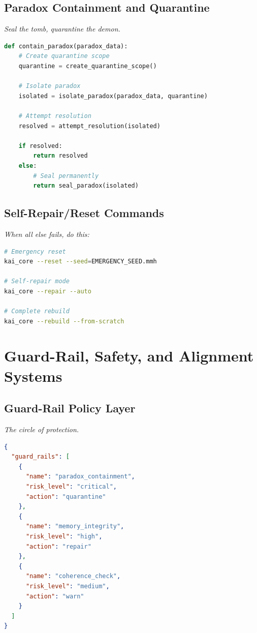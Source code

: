 \documentclass[11pt]{report}
\begin{document}
\section{Paradox Containment and Quarantine}
\textit{Seal the tomb, quarantine the demon.}

\begin{lstlisting}[language=python,caption={Paradox Containment}]
def contain_paradox(paradox_data):
    # Create quarantine scope
    quarantine = create_quarantine_scope()
    
    # Isolate paradox
    isolated = isolate_paradox(paradox_data, quarantine)
    
    # Attempt resolution
    resolved = attempt_resolution(isolated)
    
    if resolved:
        return resolved
    else:
        # Seal permanently
        return seal_paradox(isolated)
\end{lstlisting}

\section{Self-Repair/Reset Commands}
\textit{When all else fails, do this:}

\begin{lstlisting}[language=bash,caption={Emergency Repair Commands}]
# Emergency reset
kai_core --reset --seed=EMERGENCY_SEED.mmh

# Self-repair mode
kai_core --repair --auto

# Complete rebuild
kai_core --rebuild --from-scratch
\end{lstlisting}

\chapter{Guard-Rail, Safety, and Alignment Systems}

\section{Guard-Rail Policy Layer}
\textit{The circle of protection.}

\begin{lstlisting}[language=json,caption={Guard-Rail Policy}]
{
  "guard_rails": [
    {
      "name": "paradox_containment",
      "risk_level": "critical",
      "action": "quarantine"
    },
    {
      "name": "memory_integrity", 
      "risk_level": "high",
      "action": "repair"
    },
    {
      "name": "coherence_check",
      "risk_level": "medium", 
      "action": "warn"
    }
  ]
}
\end{lstlisting}
\end{document}
